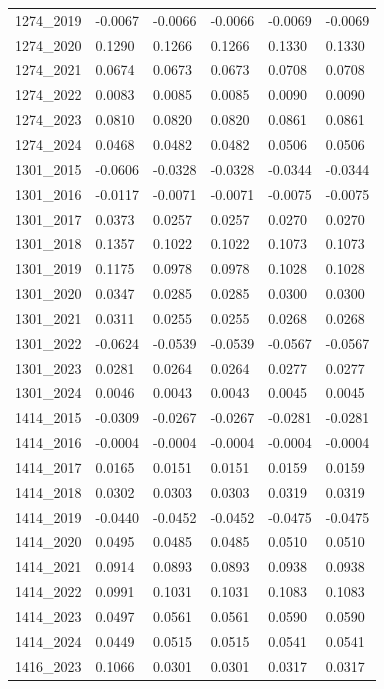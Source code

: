 \begin{table}[htbp]
\begin{tabular}{llllll}
1274_2019 & -0.0067 & -0.0066 & -0.0066 & -0.0069 & -0.0069 \\
1274_2020 & 0.1290 & 0.1266 & 0.1266 & 0.1330 & 0.1330 \\
1274_2021 & 0.0674 & 0.0673 & 0.0673 & 0.0708 & 0.0708 \\
1274_2022 & 0.0083 & 0.0085 & 0.0085 & 0.0090 & 0.0090 \\
1274_2023 & 0.0810 & 0.0820 & 0.0820 & 0.0861 & 0.0861 \\
1274_2024 & 0.0468 & 0.0482 & 0.0482 & 0.0506 & 0.0506 \\
1301_2015 & -0.0606 & -0.0328 & -0.0328 & -0.0344 & -0.0344 \\
1301_2016 & -0.0117 & -0.0071 & -0.0071 & -0.0075 & -0.0075 \\
1301_2017 & 0.0373 & 0.0257 & 0.0257 & 0.0270 & 0.0270 \\
1301_2018 & 0.1357 & 0.1022 & 0.1022 & 0.1073 & 0.1073 \\
1301_2019 & 0.1175 & 0.0978 & 0.0978 & 0.1028 & 0.1028 \\
1301_2020 & 0.0347 & 0.0285 & 0.0285 & 0.0300 & 0.0300 \\
1301_2021 & 0.0311 & 0.0255 & 0.0255 & 0.0268 & 0.0268 \\
1301_2022 & -0.0624 & -0.0539 & -0.0539 & -0.0567 & -0.0567 \\
1301_2023 & 0.0281 & 0.0264 & 0.0264 & 0.0277 & 0.0277 \\
1301_2024 & 0.0046 & 0.0043 & 0.0043 & 0.0045 & 0.0045 \\
1414_2015 & -0.0309 & -0.0267 & -0.0267 & -0.0281 & -0.0281 \\
1414_2016 & -0.0004 & -0.0004 & -0.0004 & -0.0004 & -0.0004 \\
1414_2017 & 0.0165 & 0.0151 & 0.0151 & 0.0159 & 0.0159 \\
1414_2018 & 0.0302 & 0.0303 & 0.0303 & 0.0319 & 0.0319 \\
1414_2019 & -0.0440 & -0.0452 & -0.0452 & -0.0475 & -0.0475 \\
1414_2020 & 0.0495 & 0.0485 & 0.0485 & 0.0510 & 0.0510 \\
1414_2021 & 0.0914 & 0.0893 & 0.0893 & 0.0938 & 0.0938 \\
1414_2022 & 0.0991 & 0.1031 & 0.1031 & 0.1083 & 0.1083 \\
1414_2023 & 0.0497 & 0.0561 & 0.0561 & 0.0590 & 0.0590 \\
1414_2024 & 0.0449 & 0.0515 & 0.0515 & 0.0541 & 0.0541 \\
1416_2023 & 0.1066 & 0.0301 & 0.0301 & 0.0317 & 0.0317 \\

\end{tabular}
\end{table}
